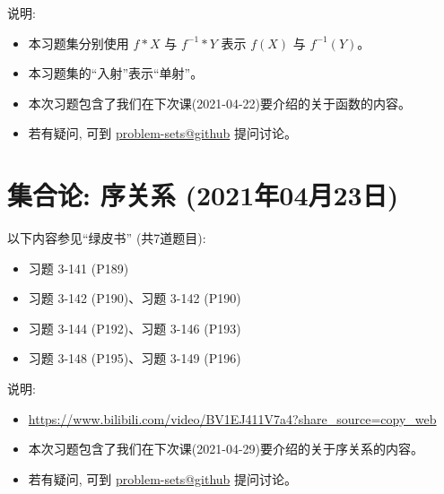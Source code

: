 \documentclass{article}
\begin{document}
说明:
\begin{itemize}
  \item 本习题集分别使用 $f \ast X$ 与 $f^{-1} \ast Y$ 表示 $f(X)$ 与 $f^{-1}(Y)$。
  \item 本习题集的``入射''表示``单射''。
  \item 本次习题包含了我们在下次课(2021-04-22)要介绍的关于函数的内容。
  \item 若有疑问, 可到 \href{https://github.com/courses-at-nju-by-hfwei/discrete-math-problem-sets/discussions}{problem-sets@github} 提问讨论。
\end{itemize}
\section{集合论: 序关系 (2021年04月23日)}

以下内容参见``绿皮书'' (共7道题目):
\begin{itemize}
  \item 习题 3-141 (P189)
  \item 习题 3-142 (P190)、习题 3-142 (P190)
  \item 习题 3-144 (P192)、习题 3-146 (P193)
  \item 习题 3-148 (P195)、习题 3-149 (P196)
\end{itemize}

说明:
\begin{itemize}
  \item \url{https://www.bilibili.com/video/BV1EJ411V7a4?share_source=copy_web}
  \item 本次习题包含了我们在下次课(2021-04-29)要介绍的关于序关系的内容。
  \item 若有疑问, 可到 \href{https://github.com/courses-at-nju-by-hfwei/discrete-math-problem-sets/discussions}{problem-sets@github} 提问讨论。
\end{itemize}
\end{document}
